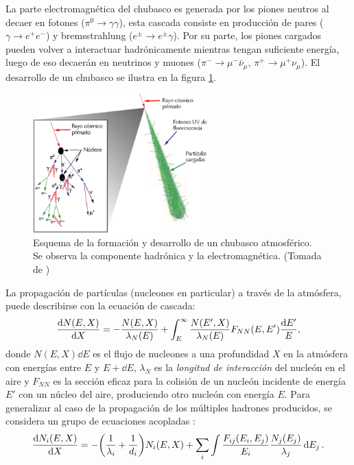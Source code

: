 	La parte electromagnética del chubasco es generada por los piones neutros al decaer en fotones ($\pi^0 \rightarrow \gamma \gamma$), esta cascada consiste en producción de pares ($\gamma\rightarrow e^+ e^-$) y bremsstrahlung ($e^{\pm} \rightarrow e^{\pm}\gamma$). Por su parte, los piones cargados pueden volver a interactuar hadrónicamente mientras tengan suficiente energía, luego de eso decaerán en neutrinos y muones ($\pi^{-} \rightarrow \mu^- \bar{\nu}_{\mu}$, $\pi^{+} \rightarrow \mu^+ \nu_{\mu} $). El desarrollo de un chubasco se ilustra en la figura \ref{fig:airshower}.\\
				
	\begin{figure}[h]
	\centering
	\includegraphics[width=0.6\textwidth]{Figuras/air_shower} 
	\caption{Esquema de la formación y desarrollo de un chubasco atmosférico. Se observa la componente hadrónica y la electromagnética. (Tomada de \cite{Poderosas})}
	\label{fig:airshower}
	\end{figure}	

	La propagación de partículas (nucleones en particular) a través de la atmósfera, puede describirse con la ecuación de cascada:
	\begin{align}
	\dv{N(E,X)}{X} = -\frac{N(E,X)}{\lambda_N(E)} + \int_E^{\infty}\frac{N(E',X)}{\lambda_N(E)} F_{NN}(E,E') \frac{\dd E'}{E},
	\end{align}
	donde $N(E,X) \dd E$ es el flujo de nucleones a una profundidad $X$ en la atmósfera con energías entre $E$ y $E+\dd E$, $\lambda_N$ es la \textit{longitud de interacción} del nucleón en el aire y $F_{NN}$ es la sección eficaz para la colisión de un nucleón incidente de energía $E'$ con un núcleo del aire, produciendo otro nucleón con energía $E$. Para generalizar al caso de la propagación de los múltiples hadrones producidos, se considera un grupo de ecuaciones acopladas \cite{Gaisser1990}:
	\begin{align}
	\dv{N_i(E,X)}{X} = -\qty(\frac{1}{\lambda_i}+\frac{1}{d_i}) N_i(E,X) + \sum_i \int \frac{F_{ij}(E_i,E_j)}{E_i} \frac{N_j(E_j)}{\lambda_j} \dd{E_j}.
	\end{align}
	
